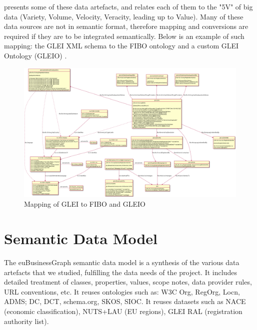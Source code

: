 \documentclass[runningheads,a4paper]{llncs}
\makeatletter
\def\maxwidth#1{\ifdim\Gin@nat@width>#1 #1\else\Gin@nat@width\fi}
\makeatother
\begin{document}
 \cite{_Ref491191838} presents some of these data artefacts, and relates each of them to the "5V" of big data (Variety, Volume, Velocity, Veracity, leading up to Value). Many of these data sources are not in semantic format, therefore mapping and conversions are required if they are to be integrated semantically. Below is an example of such mapping: the GLEI XML schema to the FIBO ontology and a custom GLEI Ontology (GLEIO)  \cite{_Ref491193086}.
\begin{figure}[h!]
\centering
\includegraphics[width=\maxwidth{\textwidth}]{img/10000000000007EF000004DB01B7ECB38C2017BA.png}
\cprotect\caption{Mapping of GLEI to FIBO and GLEIO}
\label{}
\end{figure}


\section{Semantic Data Model}

The euBusinessGraph semantic data model  \cite{__RefNumPara__7184_1562275339} is a synthesis of the various data artefacts that we studied, fulfilling the data needs of the project. It includes detailed treatment of classes, properties, values, scope notes, data provider rules, URL conventions, etc. It reuses ontologies such as: W3C Org, RegOrg, Locn, ADMS; DC, DCT, schema.org, SKOS, SIOC. It reuses datasets such as NACE (economic classification), NUTS+LAU (EU regions), GLEI RAL (registration authority list). 
\end{document}
